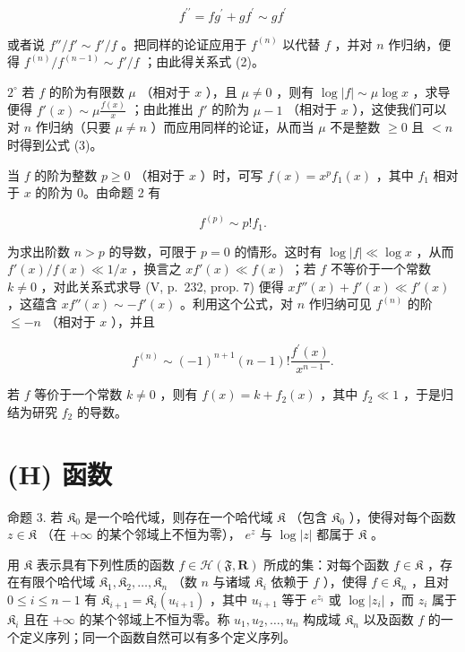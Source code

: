 \[
f ^ {\prime \prime} = f g ^ {\prime} + g f ^ {\prime} \sim g f ^ {\prime}
\]

或者说 \(f'' / f' \sim f' / f\) 。把同样的论证应用于 \(f^{(n)}\) 以代替 \(f\) ，并对 \(n\) 作归纳，便得 \(f^{(n)} / f^{(n-1)} \sim f' / f\) ；由此得关系式 (2)。

\(2^{\circ}\) 若 \(f\) 的阶为有限数 \(\mu\) （相对于 \(x\) ），且 \(\mu \neq 0\) ，则有 \(\log |f| \sim \mu \log x\) ，求导便得 \(f'(x) \sim \mu \frac{f(x)}{x}\) ；由此推出 \(f'\) 的阶为 \(\mu - 1\) （相对于 \(x\) ），这使我们可以对 \(n\) 作归纳（只要 \(\mu \neq n\) ）而应用同样的论证，从而当 \(\mu\) 不是整数 \(\geqslant 0\) 且 \(< n\) 时得到公式 (3)。

当 \(f\) 的阶为整数 \(p \geqslant 0\) （相对于 \(x\) ）时，可写 \(f(x) = x^p f_1(x)\) ，其中 \(f_1\) 相对于 \(x\) 的阶为 0。由命题 2 有

\[
f ^ {(p)} \sim p! f _ {1}.
\]

为求出阶数 \(n > p\) 的导数，可限于 \(p = 0\) 的情形。这时有 \(\log |f| \ll \log x\) ，从而 \(f'(x) / f(x) \ll 1 / x\) ，换言之 \(xf'(x) \ll f(x)\) ；若 \(f\) 不等价于一个常数 \(k \neq 0\) ，对此关系式求导 (V, p.~232, prop. 7) 便得 \(xf''(x) + f'(x) \ll f'(x)\) ，这蕴含 \(xf''(x) \sim -f'(x)\) 。利用这个公式，对 \(n\) 作归纳可见 \(f^{(n)}\) 的阶 \(\leqslant -n\) （相对于 \(x\) ），并且

\[
f ^ {(n)} \sim (- 1) ^ {n + 1} (n - 1)! \frac {f ^ {\prime} (x)}{x ^ {n - 1}}.\tag{4}
\]

若 \(f\) 等价于一个常数 \(k \neq 0\) ，则有 \(f(x) = k + f_2(x)\) ，其中 \(f_2 \ll 1\) ，于是归结为研究 \(f_2\) 的导数。

\section{(H) 函数}

命题 3. 若 \(\mathfrak{K}_0\) 是一个哈代域，则存在一个哈代域 \(\mathfrak{K}\) （包含 \(\mathfrak{K}_0\) ），使得对每个函数 \(z \in \mathfrak{K}\) （在 \(+\infty\) 的某个邻域上不恒为零）， \(e^z\) 与 \(\log |z|\) 都属于 \(\mathfrak{K}\) 。

用 \(\mathfrak{K}\) 表示具有下列性质的函数 \(f\in \mathcal{H}(\mathfrak{F},\mathbf{R})\) 所成的集：对每个函数 \(f\in \mathfrak{K}\) ，存在有限个哈代域 \(\mathfrak{K}_1,\mathfrak{K}_2,\ldots ,\mathfrak{K}_n\) （数 \(n\) 与诸域 \(\mathfrak{K}_i\) 依赖于 \(f\) ），使得 \(f\in \mathfrak{K}_n\) ，且对 \(0\leqslant i\leqslant n - 1\) 有 \(\mathfrak{K}_{i + 1} = \mathfrak{K}_i(u_{i + 1})\) ，其中 \(u_{i + 1}\) 等于 \(e^{z_i}\) 或 \(\log |z_i|\) ，而 \(z_{i}\) 属于 \(\mathfrak{K}_i\) 且在 \(+\infty\) 的某个邻域上不恒为零。称 \(u_{1},u_{2},\ldots ,u_{n}\) 构成域 \(\mathfrak{K}_n\) 以及函数 \(f\) 的一个定义序列；同一个函数自然可以有多个定义序列。

